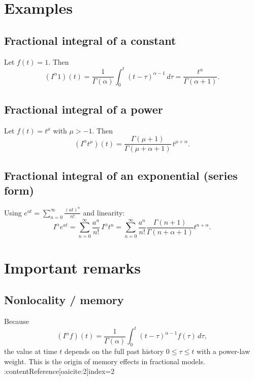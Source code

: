 
\section{Examples}

\subsection{Fractional integral of a constant}
Let $f(t)=1$. Then
\begin{equation}
(I^\alpha 1)(t)
=
\frac{1}{\Gamma(\alpha)}
\int_0^t (t-\tau)^{\alpha-1}\,d\tau
=
\frac{t^\alpha}{\Gamma(\alpha+1)}.
\end{equation}

\subsection{Fractional integral of a power}
Let $f(t)=t^\mu$ with $\mu>-1$. Then
\begin{equation}
\boxed{
(I^\alpha t^\mu)(t)
=
\frac{\Gamma(\mu+1)}{\Gamma(\mu+\alpha+1)}\,t^{\mu+\alpha}.
}
\end{equation}

\subsection{Fractional integral of an exponential (series form)}
Using $e^{at}=\sum_{n=0}^\infty \frac{(at)^n}{n!}$ and linearity:
\begin{equation}
I^\alpha e^{at}
=
\sum_{n=0}^\infty \frac{a^n}{n!}\,I^\alpha t^n
=
\sum_{n=0}^\infty \frac{a^n}{n!}\frac{\Gamma(n+1)}{\Gamma(n+\alpha+1)}t^{n+\alpha}.
\end{equation}


\section{Important remarks}

\subsection{Nonlocality / memory}
Because
\[
(I^\alpha f)(t)=\frac{1}{\Gamma(\alpha)}\int_0^t (t-\tau)^{\alpha-1}f(\tau)\,d\tau,
\]
the value at time $t$ depends on the full past history $0\le\tau\le t$ with a power-law weight.
This is the origin of memory effects in fractional models. :contentReference[oaicite:2]{index=2}

